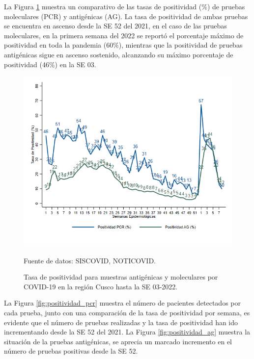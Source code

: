 \documentclass[12pt,a4paper,openany]{book}
\begin{document}
  La Figura \ref{fig:total_muestras_procesada} muestra un comparativo de las tasas de positividad ($\%$) de pruebas moleculares (PCR) y antigénicas (AG). La tasa de positividad de ambas pruebas se encuentra en ascenso desde la SE 52 del 2021, en el caso de las pruebas moleculares, en la primera semana del 2022 se reportó el porcentaje máximo de positividad en toda la pandemia (60$\%$), mientras que la positividad de pruebas antigénicas sigue en ascenso sostenido, alcanzando su máximo porcentaje de positividad (46$\%$) en la SE 03. 
  
   \begin{figure}[h]
	\caption{Tasa de positividad para muestras antigénicas y moleculares por COVID-19 en la región Cusco hasta la SE 03-2022. }\label{fig:total_muestras_procesada}
	\begin{center}
		\includegraphics[width=0.75\linewidth]{../figuras/positividad_diaria_2021_2022.png}
	\end{center}
	{\footnotesize {Fuente de datos: SISCOVID, NOTICOVID.}}
\end{figure}


La Figura \ref{fig:positividad_pcr} muestra el número de pacientes detectados por cada prueba, junto con una comparación de la tasa de positividad por semana, es evidente que el número de pruebas realizadas y la tasa de positividad han ido incrementando desde la SE 52 del 2021. La Figura \ref{fig:positividad_ag}
muestra la situación de la pruebas antigénicas, se aprecia un marcado incremento en el número de pruebas positivas desde la SE 52.   
\end{document}
